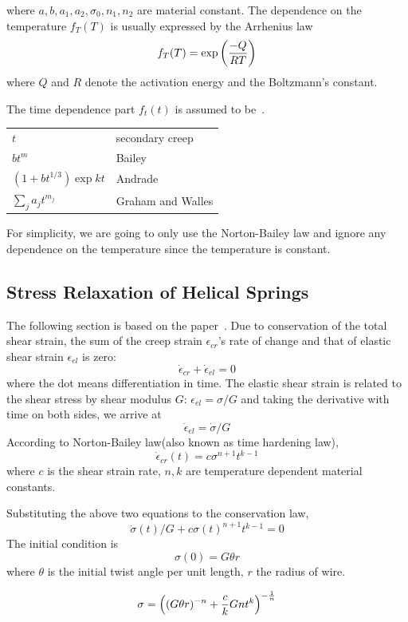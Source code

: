 \documentclass[10pt]{article}
\begin{document}
where $a,b,a_1,a_2,\sigma_0,n_1,n_2$ are material constant. The dependence on the temperature $f_T(T)$ is usually expressed by the Arrhenius law
\[
f_T(T) = \exp \left( {-Q\over RT}\right)
\]
where $Q$ and $R$ denote the activation energy and the Boltzmann's constant.

The time dependence part $f_t(t)$ is assumed to be~\cite{Ch2000}.

\begin{tabular}{ll}
$t$ & secondary creep \\
$bt^m$ & Bailey \\
$(1+bt^{1/3})\exp{kt}$ & Andrade\\
$\sum_j a_j t^{m_j}$ & Graham and Walles
\end{tabular}

For simplicity, we are going to only use the Norton-Bailey law and ignore any dependence on the temperature since the temperature is constant.

\subsection{Stress Relaxation of Helical Springs}

The following section is based on the paper~\cite{Relaxation1}. Due to conservation of the total shear strain, the sum of the creep strain $\epsilon_{cr}$'s rate of change and that of elastic shear strain $\epsilon_{el}$ is zero:
\[
\dot{\epsilon}_{cr} + \dot{\epsilon}_{el} = 0
\]
where the dot means differentiation in time. The elastic shear strain is related to the shear stress by shear modulus $G$: $\epsilon_{el} = \sigma/G$ and taking the derivative with time on both sides, we arrive at
\[
\dot{\epsilon}_{el} = \dot{\sigma}/G
\]
According to Norton-Bailey law(also known as time hardening law),
\begin{equation} \label{eq:N-B}
\dot{\epsilon}_{cr}(t)=c\sigma^{n+1} t^{k-1}
\end{equation}
where $c$ is the shear strain rate, $n,k$ are temperature dependent material constants.

Substituting the above two equations to the conservation law,
\begin{equation} \label{eq:diff}
\dot{\sigma}(t)/G+c\sigma(t)^{n+1} t^{k-1}=0
\end{equation}
The initial condition is
\[
\sigma (0) = G\theta r
\]
where $\theta$ is the initial twist angle per unit length, $r$ the radius of wire.

\[
\sigma = \left( (G\theta r)^{-n} + {c\over k} Gnt^k \right)^{-{1\over n}}
\]
\end{document}
